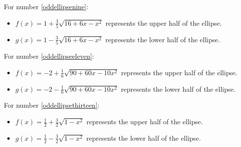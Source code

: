 \documentclass{ximera}
\begin{document}
\begin{enumerate}
For number \ref{oddellipsenine}:

\begin{itemize}

\item  $f(x) = 1 + \frac{3}{5} \sqrt{16+6x-x^2}$ represents the upper half of the ellipse.

\item  $g(x) =  1 - \frac{3}{5} \sqrt{16+6x-x^2} $   represents the lower half of the ellipse.

\end{itemize}


For number \ref{oddellipseeleven}:

\begin{itemize}

\item  $f(x) = -2 + \frac{1}{6} \sqrt{90+60x-10x^2}$ represents the upper half of the ellipse.

\item  $g(x) =  -2 -  \frac{1}{6} \sqrt{90+60x-10x^2}  $   represents the lower half of the ellipse.

\end{itemize}

\newpage


For number \ref{oddellipsethirteen}:

\begin{itemize}

\item  $f(x) = \frac{1}{2} + \frac{3}{2} \sqrt{1-x^2} $ represents the upper half of the ellipse.

\item  $g(x) =  \frac{1}{2} - \frac{3}{2} \sqrt{1-x^2} $   represents the lower half of the ellipse.

\end{itemize}


\setcounter{HW}{\value{enumi}}
\end{enumerate}
\end{document}
